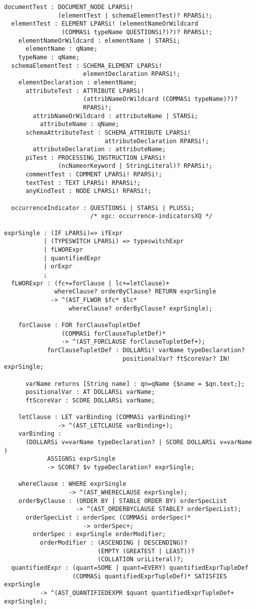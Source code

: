 \begin{Verbatim}[frame=none, fontsize=\footnotesize]
documentTest : DOCUMENT_NODE LPARSi! 
               (elementTest | schemaElementTest)? RPARSi!;
  elementTest : ELEMENT LPARSi! (elementNameOrWildcard 
                (COMMASi typeName QUESTIONSi?)?)? RPARSi!;
    elementNameOrWildcard : elementName | STARSi;
      elementName : qName;
    typeName : qName;
  schemaElementTest : SCHEMA_ELEMENT LPARSi! 
                      elementDeclaration RPARSi!;
    elementDeclaration : elementName;
      attributeTest : ATTRIBUTE LPARSi! 
                      (attribNameOrWildcard (COMMASi typeName)?)? 
                      RPARSi!;
        attribNameOrWildcard : attributeName | STARSi;
          attributeName : qName;
      schemaAttributeTest : SCHEMA_ATTRIBUTE LPARSi! 
                            attributeDeclaration RPARSi!;
        attributeDeclaration : attributeName;
      piTest : PROCESSING_INSTRUCTION LPARSi! 
               (ncNameorKeyword | StringLiteral)? RPARSi!;
      commentTest : COMMENT LPARSi! RPARSi!;
      textTest : TEXT LPARSi! RPARSi!;
      anyKindTest : NODE LPARSi! RPARSi!;

  occurrenceIndicator : QUESTIONSi | STARSi | PLUSSi; 
                        /* xgc: occurrence-indicatorsXQ */

exprSingle : (IF LPARSi)=> ifExpr
           | (TYPESWITCH LPARSi) => typeswitchExpr
           | fLWORExpr
           | quantifiedExpr
           | orExpr
           ;
  fLWORExpr : (fc+=forClause | lc+=letClause)+ 
              whereClause? orderByClause? RETURN exprSingle
             -> ^(AST_FLWOR $fc* $lc* 
                  whereClause? orderByClause? exprSingle);

    forClause : FOR forClauseTupletDef 
                (COMMASi forClauseTupletDef)*
                -> ^(AST_FORCLAUSE forClauseTupletDef+);
            forClauseTupletDef : DOLLARSi! varName typeDeclaration? 
                                 positionalVar? ftScoreVar? IN! exprSingle;

      varName returns [String name] : qn=qName {$name = $qn.text;};
      positionalVar : AT DOLLARSi varName;
      ftScoreVar : SCORE DOLLARSi varName;

    letClause : LET varBinding (COMMASi varBinding)*
               -> ^(AST_LETCLAUSE varBinding+);
    varBinding :
      (DOLLARSi v=varName typeDeclaration? | SCORE DOLLARSi v=varName )
            ASSIGNSi exprSingle
            -> SCORE? $v typeDeclaration? exprSingle;

    whereClause : WHERE exprSingle
                  -> ^(AST_WHERECLAUSE exprSingle);
    orderByClause : (ORDER BY | STABLE ORDER BY) orderSpecList
                    -> ^(AST_ORDERBYCLAUSE STABLE? orderSpecList);
      orderSpecList : orderSpec (COMMASi orderSpec)*
                      -> orderSpec+;
        orderSpec : exprSingle orderModifier;
          orderModifier : (ASCENDING | DESCENDING)? 
                          (EMPTY (GREATEST | LEAST))? 
                          (COLLATION uriLiteral)?;
  quantifiedExpr : (quant=SOME | quant=EVERY) quantifiedExprTupleDef
                   (COMMASi quantifiedExprTupleDef)* SATISFIES exprSingle
          -> ^(AST_QUANTIFIEDEXPR $quant quantifiedExprTupleDef+ exprSingle);


\end{Verbatim}
